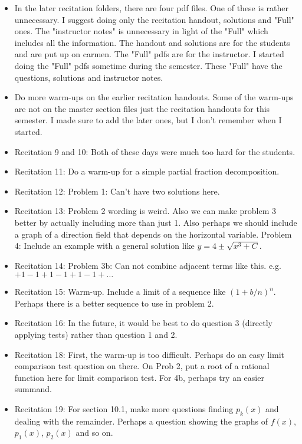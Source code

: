 \documentclass{article}
\begin{document}
\large

\begin{itemize}
\item In the later recitation folders, there are four pdf files. One of these is rather unnecessary. I suggest doing only the recitation handout, solutions and "Full" ones. The "instructor notes" is unnecessary in light of the "Full" which includes all the information. The handout and solutions are for the students and are put up on carmen. The "Full" pdfs are for the instructor. I started doing the "Full" pdfs sometime during the semester. These "Full" have the questions, solutions and instructor notes. 
\item Do more warm-ups on the earlier recitation handouts. Some of the warm-ups are not on the master section files just the recitation handouts for this semester. I made sure to add the later ones, but I don't remember when I started.
\item Recitation 9 and 10: Both of these days were much too hard for the students. 
\item Recitation 11: Do a warm-up for a simple partial fraction decomposition.
\item Recitation 12: Problem 1: Can't have two solutions here.
\item Recitation 13: Problem 2 wording is weird. Also we can make problem 3 better by actually including more than just 1. Also perhaps we should include a graph of a direction field that depends on the horizontal variable. Problem 4: Include an example with a general solution like $y=4\pm \sqrt{x^3+C}$. 
\item Recitation 14: Problem 3b: Can not combine adjacent terms like this. e.g. $+1-1+1-1+1-1+\ldots$
\item Recitation 15: Warm-up. Include a limit of a sequence like $(1+b/n)^n$. Perhaps there is a better sequence to use in problem 2.
\item Recitation 16: In the future, it would be best to do question 3 (directly applying tests) rather than question 1 and 2.
\item Recitation 18: First, the warm-up is too difficult. Perhaps do an easy limit comparison test question on there. On Prob 2, put a root of a rational function here for limit comparison test. For 4b, perhaps try an easier summand. 
\item Recitation 19: For section 10.1, make more questions finding $p_k(x)$ and dealing with the remainder. Perhaps a question showing the graphs of $f(x)$, $p_1(x)$, $p_2(x)$ and so on.  

\end{itemize}
\end{document}

